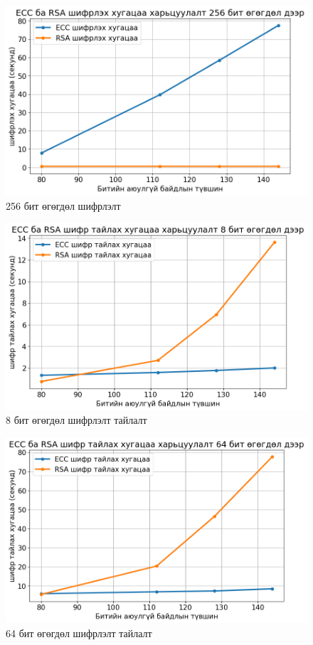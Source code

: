 	\begin{figure}[h]
		\centering
		\includegraphics[scale=0.65]{assets/graphs/3.png}
		\caption{256 бит өгөгдөл шифрлэлт}
		\label{fig:architecture}
	\end{figure}
	\begin{figure}[h]
		\centering
		\includegraphics[scale=0.65]{assets/graphs/4.png}
		\caption{8 бит өгөгдөл шифрлэлт тайлалт}
		\label{fig:architecture}
	\end{figure}
	\begin{figure}[h]
		\centering
		\includegraphics[scale=0.65]{assets/graphs/5.png}
		\caption{64 бит өгөгдөл шифрлэлт тайлалт}
		\label{fig:architecture}
	\end{figure}
